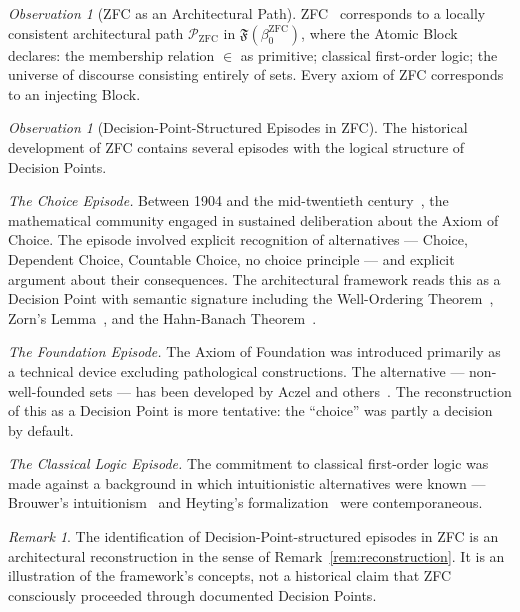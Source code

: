\documentclass[12pt, a4paper]{article}
\theoremstyle{plain}
\theoremstyle{definition}
\theoremstyle{remark}
\newtheorem{remark}[theorem]{Remark}
\newtheorem{observation}[theorem]{Observation}
\newcommand{\FS}[1]{\mathfrak{F}(#1)}
\begin{document}
\begin{observation}[ZFC as an Architectural Path]
\label{obs:zfc-path}
ZFC~\cite{Jech2003,Zermelo1908} corresponds to a locally consistent
architectural path $\mathcal{P}_{\mathrm{ZFC}}$ in
$\FS{\beta_0^{\mathrm{ZFC}}}$, where the Atomic Block declares: the
membership relation $\in$ as primitive; classical first-order logic;
the universe of discourse consisting entirely of sets. Every axiom
of ZFC corresponds to an injecting Block.
\end{observation}

\begin{observation}[Decision-Point-Structured Episodes in ZFC]
\label{obs:zfc-episodes}
The historical development of ZFC contains several episodes with the
logical structure of Decision Points.

\textit{The Choice Episode.} Between 1904 and the mid-twentieth century~\cite{BaireEtAl1905,Moore1982,Zermelo1904}, the mathematical
community engaged in sustained deliberation about the Axiom of Choice.
The episode involved explicit recognition of alternatives --- Choice,
Dependent Choice, Countable Choice, no choice principle --- and
explicit argument about their consequences. The architectural framework
reads this as a Decision Point with semantic signature including the
Well-Ordering Theorem~\cite{Zermelo1904}, Zorn's Lemma~\cite{Jech2003},
and the Hahn-Banach Theorem~\cite{Kunen1980}.

\textit{The Foundation Episode.} The Axiom of Foundation was
introduced primarily as a technical device excluding pathological
constructions. The alternative --- non-well-founded sets --- has been
developed by Aczel and others~\cite{Aczel1988,AczelRathjen2001}. The
reconstruction of this as a Decision Point is more tentative: the
``choice'' was partly a decision by default.

\textit{The Classical Logic Episode.} The commitment to classical
first-order logic was made against a background in which intuitionistic
alternatives were known --- Brouwer's intuitionism~\cite{Brouwer1907}
and Heyting's formalization~\cite{Heyting1930,Heyting1956} were
contemporaneous.
\end{observation}

\begin{remark}
The identification of Decision-Point-structured episodes in ZFC is an
architectural reconstruction in the sense of Remark~\ref{rem:reconstruction}.
It is an illustration of the framework's concepts, not a historical
claim that ZFC consciously proceeded through documented Decision Points.
\end{remark}
\end{document}
